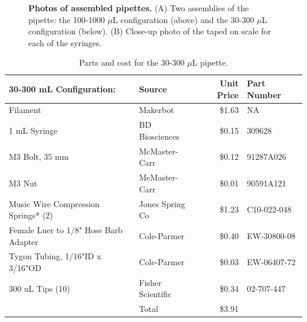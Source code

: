 \documentclass[10pt,letterpaper]{article}
\begin{document}
\begin{figure}
	\caption{
		{\bf Photos of assembled pipettes.}  (A) Two assemblies of the pipette: the 100-1000 $\mu$L configuration (above) and the 30-300 $\mu$L configuration (below). (B) Close-up photo of the taped on scale for each of the syringes. 
	}
	\label{fig3}
\end{figure}

\begin{table}[!ht]
\centering
\caption{Parts and cost for the 30-300 $\mu$L pipette.}
\label{table1}
	\begin{tabular}{|l|l|r|l|}
		\hline
	30-300 mL Configuration:              & Source            & Unit Price & Part Number \\ \hline
	Filament                              & Makerbot          & \$1.63     & NA          \\ \hline
	1 mL Syringe                          & BD Biosciences    & \$0.15     & 309628      \\ \hline
	M3 Bolt, 35 mm                        & McMaster-Carr     & \$0.12     & 91287A026   \\ \hline
	M3 Nut                                & McMaster-Carr     & \$0.01     & 90591A121   \\ \hline
	Music Wire Compression Springs* (2)   & Jones Spring Co   & \$1.23     & C10-022-048 \\ \hline
	Female Luer to 1/8" Hose Barb Adapter & Cole-Parmer       & \$0.40     & EW-30800-08 \\ \hline
	Tygon Tubing, 1/16"ID x 3/16"OD       & Cole-Parmer       & \$0.03     & EW-06407-72 \\ \hline
	300 uL Tips (10)                      & Fisher Scientific & \$0.34     & 02-707-447  \\ \hline
	& Total             & \$3.91     &     \\ \hline        
	\end{tabular}
\end{table}
\end{document}
